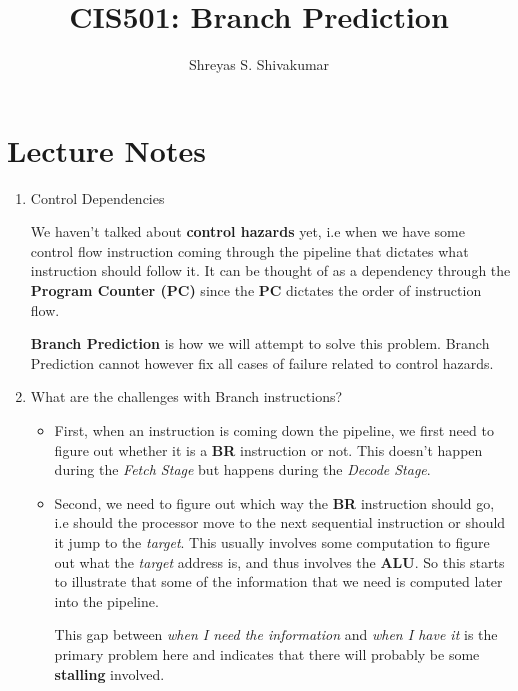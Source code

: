 \documentclass[12pt]{article}
\title{CIS501: Branch Prediction}
\author[1]{Shreyas S. Shivakumar}
\newenvironment{QandA}{\begin{enumerate}[label=\bfseries\alph*.]\bfseries}
                      {\end{enumerate}}
\newenvironment{answered}{\par\quad\normalfont}{}
\begin{document}
\maketitle

\section{Lecture Notes}

\begin{QandA}
\item Control Dependencies
\begin{answered}
    We haven't talked about \textbf{control hazards} yet, i.e when we have some control flow instruction coming through the pipeline that dictates what instruction should follow it. It can be thought of as a dependency through the \textbf{Program Counter (PC)} since the \textbf{PC} dictates the order of instruction flow. 
    
    \qquad\textbf{Branch Prediction} is how we will attempt to solve this problem. Branch Prediction cannot however fix all cases of failure related to control hazards. 
\end{answered}

\item What are the challenges with Branch instructions?
\vspace{-0.85cm}
\begin{answered}
\begin{itemize}
    \item First, when an instruction is coming down the pipeline, we first need to figure out whether it is a \textbf{BR} instruction or not. This doesn't happen during the \textit{Fetch Stage} but happens during the \textit{Decode Stage}.
    
    \item Second, we need to figure out which way the \textbf{BR} instruction should go, i.e should the processor move to the next sequential instruction or should it jump to the \textit{target}. This usually involves some computation to figure out what the \textit{target} address is, and thus involves the \textbf{ALU}. So this starts to illustrate that some of the information that we need is computed later into the pipeline.
    
    This gap between \textit{when I need the information} and \textit{when I have it} is the primary problem here and indicates that there will probably be some \textbf{stalling} involved.
    

\end{itemize}
\end{answered}
\end{QandA}
\end{document}
